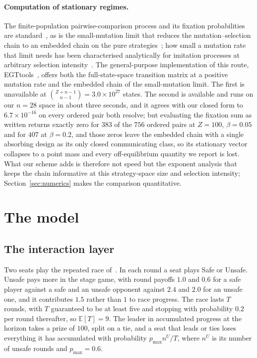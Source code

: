 \documentclass[a4paper,fleqn]{cas-sc}
\begin{document}
\paragraph{Computation of stationary regimes.}
The finite-population pairwise-comparison process and its fixation
probabilities are standard~\citep{traulsen2006stochastic,sandholm2010population},
as is the small-mutation limit that reduces the mutation--selection chain to an
embedded chain on the pure
strategies~\citep{fudenberg2006imitation,fudenberg2006strong,nowak2004emergence};
how small a mutation rate that limit needs has been characterised analytically
for imitation processes at arbitrary selection
intensity~\citep{wu2012howsmall}. The general-purpose implementation of this
route, EGTtools~\citep{domingos2023egttools}, offers both the full-state-space
transition matrix at a positive mutation rate and the embedded chain of the
small-mutation limit. The first is unavailable at $\binom{Z+n-1}{n-1}=
3.0\times10^{27}$ states. The second is available and runs on our $n=28$ space
in about three seconds, and it agrees with our closed form to
$6.7\times10^{-16}$ on every ordered pair both resolve; but evaluating the
fixation sum as written returns exactly zero for $383$ of the $756$ ordered
pairs at $Z=100$, $\beta=0.05$ and for $407$ at $\beta=0.2$, and those zeros
leave the embedded chain with a single absorbing design as its only closed
communicating class, so its stationary vector collapses to a point mass and
every off-equilibrium quantity we report is lost. What our scheme adds is
therefore not speed but the exponent analysis that keeps the chain informative
at this strategy-space size and selection intensity;
Section~\ref{sec:numerics} makes the comparison quantitative.

\section{The model}
\label{sec:model}

\subsection{The interaction layer}
\label{sec:interaction}

Two seats play the repeated race of~\citet{domingos2026falling}. In each round
a seat plays Safe or Unsafe. Unsafe pays more in the stage game, with round
payoffs $1.0$ and $0.6$ for a safe player against a safe and an unsafe opponent
against $2.4$ and $2.0$ for an unsafe one, and it contributes $1.5$ rather than
$1$ to race progress. The race lasts $T$ rounds, with $T$ guaranteed to be at
least five and stopping with probability $0.2$ per round thereafter, so
$\mathbb{E}[T]=9$. The leader in accumulated progress at the horizon takes a
prize of $100$, split on a tie, and a seat that leads or ties loses everything
it has accumulated with probability $p_{\max}n^{U}/T$, where $n^{U}$ is its
number of unsafe rounds and $p_{\max}=0.6$.
\end{document}
